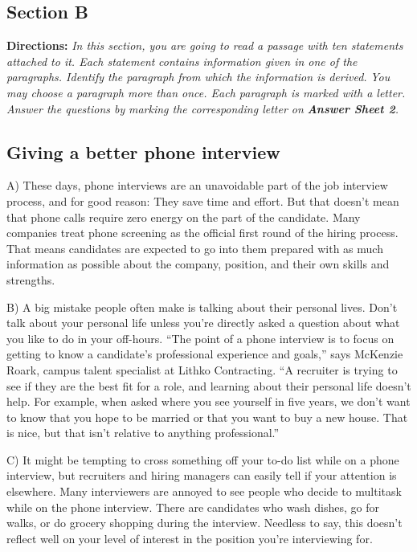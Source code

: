 \documentclass[UTF8,11pt]{ctexart}
\begin{document}
\subsection*{\textbf{Section B}}


\textbf{Directions:} \textit{In this section, you are going to read a passage with ten statements attached to it. Each statement} \textit{contains information given in one of the paragraphs. Identify the paragraph from which the information is derived.} \textit{You may choose a paragraph more than once. Each paragraph is marked with a letter. Answer the questions by} \textit{marking the corresponding letter on }\textbf{\textit{Answer Sheet 2}}\textit{.}


\subsection*{\textbf{Giving a better phone interview}}


A) These days, phone interviews are an unavoidable part of the job interview process, and for good reason: They save time and effort. But that doesn’t mean that phone calls require zero energy on the part of the candidate. Many companies treat phone screening as the official first round of the hiring process. That means candidates are expected to go into them prepared with as much information as possible about the company, position, and their own skills and strengths.


B) A big mistake people often make is talking about their personal lives. Don’t talk about your personal life unless you’re directly asked a question about what you like to do in your off-hours. “The point of a phone interview is to focus on getting to know a candidate’s professional experience and goals,” says McKenzie Roark, campus talent specialist at Lithko Contracting. “A recruiter is trying to see if they are the best fit for a role, and learning about their personal life doesn’t help. For example, when asked where you see yourself in five years, we don’t want to know that you hope to be married or that you want to buy a new house. That is nice, but that isn’t relative to anything professional.”


C) It might be tempting to cross something off your to-do list while on a phone interview, but recruiters and hiring managers can easily tell if your attention is elsewhere. Many interviewers are annoyed to see people who decide to multitask while on the phone interview. There are candidates who wash dishes, go for walks, or do grocery shopping during the interview. Needless to say, this doesn’t reflect well on your level of interest in the position you’re interviewing for.
\end{document}
